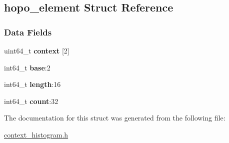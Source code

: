 \hypertarget{structhopo__element}{}\subsection{hopo\+\_\+element Struct Reference}
\label{structhopo__element}
\subsubsection*{Data Fields}
\begin{DoxyCompactItemize}
\item 
\mbox{\label{structhopo__element_a58b7710f35c288d3fa46ee630e8897c0}} 
uint64\+\_\+t {\bfseries context} \mbox{[}2\mbox{]}
\item 
\mbox{\label{structhopo__element_a45afc698a5f9df3a847ad8b966e11fc2}} 
int64\+\_\+t {\bfseries base}\+:2
\item 
\mbox{\label{structhopo__element_a2a99a0169404bb820d71b4ed447fbc73}} 
int64\+\_\+t {\bfseries length}\+:16
\item 
\mbox{\label{structhopo__element_a91b12aabf5041e22d0fe177420c20b54}} 
int64\+\_\+t {\bfseries count}\+:32
\end{DoxyCompactItemize}


The documentation for this struct was generated from the following file\+:\begin{DoxyCompactItemize}
\item 
\hyperlink{context__histogram_8h}{context\+\_\+histogram.\+h}\end{DoxyCompactItemize}
